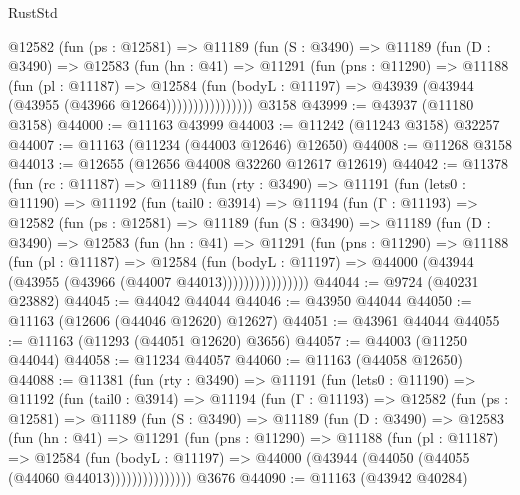 \begin{lexlean}{RustStd}
\begin{coremodule}
              @12582
                (fun (ps : @12581) =>
                @11189
                  (fun (S : @3490) =>
                  @11189
                    (fun (D : @3490) =>
                    @12583
                      (fun (hn : @41) =>
                      @11291
                        (fun (pns : @11290) =>
                        @11188
                          (fun (pl : @11187) =>
                          @12584
                            (fun (bodyL : @11197) =>
                            @43939 (@43944 (@43955 (@43966 @12664))))))))))))))))
    @3158
@43999 := @43937 (@11180 @3158)
@44000 := @11163 @43999
@44003 := @11242 (@11243 @3158) @32257
@44007 := @11163 (@11234 (@44003 @12646) @12650)
@44008 := @11268 @3158
@44013 := @12655 (@12656 @44008 @32260 @12617 @12619)
@44042 := @11378
    (fun (rc : @11187) =>
    @11189
      (fun (rty : @3490) =>
      @11191
        (fun (lets0 : @11190) =>
        @11192
          (fun (tail0 : @3914) =>
          @11194
            (fun (Γ : @11193) =>
            @12582
              (fun (ps : @12581) =>
              @11189
                (fun (S : @3490) =>
                @11189
                  (fun (D : @3490) =>
                  @12583
                    (fun (hn : @41) =>
                    @11291
                      (fun (pns : @11290) =>
                      @11188
                        (fun (pl : @11187) =>
                        @12584
                          (fun (bodyL : @11197) =>
                          @44000 (@43944 (@43955 (@43966 (@44007 @44013))))))))))))))))
@44044 := @9724 (@40231 @23882)
@44045 := @44042 @44044
@44046 := @43950 @44044
@44050 := @11163 (@12606 (@44046 @12620) @12627)
@44051 := @43961 @44044
@44055 := @11163 (@11293 (@44051 @12620) @3656)
@44057 := @44003 (@11250 @44044)
@44058 := @11234 @44057
@44060 := @11163 (@44058 @12650)
@44088 := @11381
    (fun (rty : @3490) =>
    @11191
      (fun (lets0 : @11190) =>
      @11192
        (fun (tail0 : @3914) =>
        @11194
          (fun (Γ : @11193) =>
          @12582
            (fun (ps : @12581) =>
            @11189
              (fun (S : @3490) =>
              @11189
                (fun (D : @3490) =>
                @12583
                  (fun (hn : @41) =>
                  @11291
                    (fun (pns : @11290) =>
                    @11188
                      (fun (pl : @11187) =>
                      @12584
                        (fun (bodyL : @11197) =>
                        @44000 (@43944 (@44050 (@44055 (@44060 @44013)))))))))))))))
    @3676
@44090 := @11163 (@43942 @40284)

\end{coremodule}
\end{lexlean}
